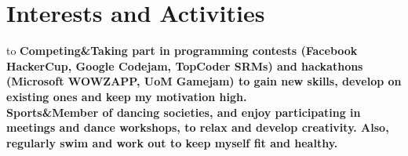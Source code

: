\documentclass[11pt,a4paper]{article}
\begin{document}
\section*{Interests and Activities\vspace{-2ex}}
\begin {tabu} to\linewidth {X[0.14, r, p]X[0.8, j, p]}
\bf Competing&Taking part in programming contests (Facebook HackerCup, Google Codejam, TopCoder SRMs) and hackathons (Microsoft WOWZAPP, UoM Gamejam)
 to gain new skills, develop on existing ones and keep my motivation high.\\
\bf Sports&Member of dancing societies, and enjoy participating in meetings and dance workshops, to relax and develop creativity. Also, regularly swim and work out to keep myself fit and healthy.\\
\end{tabu}
\thispagestyle{empty}
\end{document}
